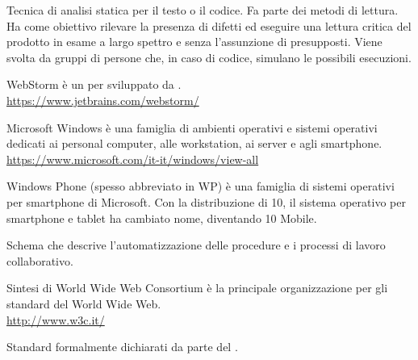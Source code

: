 Tecnica di analisi statica per il testo o il codice. Fa parte dei metodi di lettura. Ha come obiettivo rilevare la presenza di difetti ed eseguire una lettura critica del prodotto in esame a largo spettro e senza l’assunzione di presupposti. Viene svolta da gruppi di persone che, in caso di codice, simulano le possibili esecuzioni.

WebStorm è un  per  sviluppato da .\\
\url{https://www.jetbrains.com/webstorm/}

Microsoft Windows è una famiglia di ambienti operativi e sistemi operativi dedicati ai personal computer, alle workstation, ai server e agli smartphone.\\
\url{https://www.microsoft.com/it-it/windows/view-all}

Windows Phone (spesso abbreviato in WP) è una famiglia di sistemi operativi per smartphone di Microsoft. Con la distribuzione di  10, il sistema operativo per smartphone e tablet ha cambiato nome, diventando  10 Mobile.


Schema che descrive l’automatizzazione delle procedure e i processi di lavoro collaborativo.

Sintesi di World Wide Web Consortium \`e la principale organizzazione per gli standard del World Wide Web.\\
\url{http://www.w3c.it/}

Standard formalmente dichiarati da parte del .
\clearpage